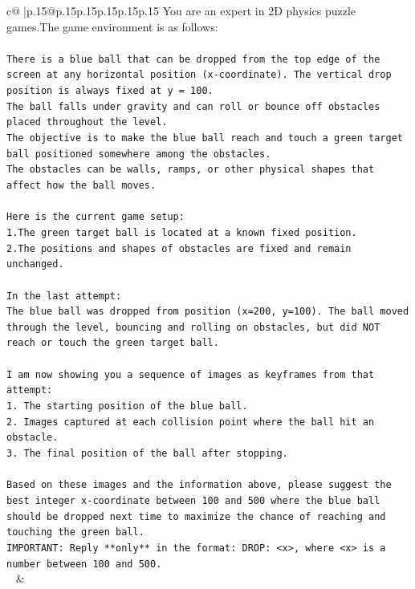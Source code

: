 \documentclass{article}
\begin{document}
{\begin{supertabular}{c@{$\;$}|p{.15\linewidth}@{}p{.15\linewidth}p{.15\linewidth}p{.15\linewidth}p{.15\linewidth}p{.15\linewidth}}
{{{	 You are an expert in 2D physics puzzle games.The game environment is as follows:\\ \tt \\ \tt There is a blue ball that can be dropped from the top edge of the screen at any horizontal position (x-coordinate). The vertical drop position is always fixed at y = 100.\\ \tt The ball falls under gravity and can roll or bounce off obstacles placed throughout the level.\\ \tt The objective is to make the blue ball reach and touch a green target ball positioned somewhere among the obstacles.\\ \tt The obstacles can be walls, ramps, or other physical shapes that affect how the ball moves.\\ \tt \\ \tt Here is the current game setup:\\ \tt 1.The green target ball is located at a known fixed position.\\ \tt 2.The positions and shapes of obstacles are fixed and remain unchanged.\\ \tt \\ \tt In the last attempt:\\ \tt The blue ball was dropped from position (x=200, y=100). The ball moved through the level, bouncing and rolling on obstacles, but did NOT reach or touch the green target ball.\\ \tt \\ \tt I am now showing you a sequence of images as keyframes from that attempt:\\ \tt 1. The starting position of the blue ball.\\ \tt 2. Images captured at each collision point where the ball hit an obstacle.\\ \tt 3. The final position of the ball after stopping.\\ \tt \\ \tt Based on these images and the information above, please suggest the best integer x-coordinate between 100 and 500 where the blue ball should be dropped next time to maximize the chance of reaching and touching the green ball.\\ \tt IMPORTANT: Reply **only** in the format: DROP: <x>, where <x> is a number between 100 and 500.\\ \tt  
	  } 
	   } 
	   } 
	 & \\ 
 

    \theutterance {}  


\end{supertabular}}
\end{document}
